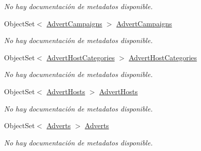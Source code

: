 \begin{DoxyCompactItemize}
\begin{DoxyCompactList}\small\item\em No hay documentación de metadatos disponible. \end{DoxyCompactList}\item 
Object\-Set$<$ \hyperlink{class_microsoft_1_1_samples_1_1_kinect_1_1_basic_interactions_1_1_advert_campaigns}{Advert\-Campaigns} $>$ \hyperlink{class_microsoft_1_1_samples_1_1_kinect_1_1_basic_interactions_1_1_o_m_k_t_d_b_entities_afd5e527893a5c2edff4c472cd26f1731}{Advert\-Campaigns}
\begin{DoxyCompactList}\small\item\em No hay documentación de metadatos disponible. \end{DoxyCompactList}\item 
Object\-Set$<$ \hyperlink{class_microsoft_1_1_samples_1_1_kinect_1_1_basic_interactions_1_1_advert_host_categories}{Advert\-Host\-Categories} $>$ \hyperlink{class_microsoft_1_1_samples_1_1_kinect_1_1_basic_interactions_1_1_o_m_k_t_d_b_entities_a6a2e6e5fad08d2d267036fb38c261060}{Advert\-Host\-Categories}
\begin{DoxyCompactList}\small\item\em No hay documentación de metadatos disponible. \end{DoxyCompactList}\item 
Object\-Set$<$ \hyperlink{class_microsoft_1_1_samples_1_1_kinect_1_1_basic_interactions_1_1_advert_hosts}{Advert\-Hosts} $>$ \hyperlink{class_microsoft_1_1_samples_1_1_kinect_1_1_basic_interactions_1_1_o_m_k_t_d_b_entities_a520efb84ce2ecf6f2feb03010ec87360}{Advert\-Hosts}
\begin{DoxyCompactList}\small\item\em No hay documentación de metadatos disponible. \end{DoxyCompactList}\item 
Object\-Set$<$ \hyperlink{class_microsoft_1_1_samples_1_1_kinect_1_1_basic_interactions_1_1_adverts}{Adverts} $>$ \hyperlink{class_microsoft_1_1_samples_1_1_kinect_1_1_basic_interactions_1_1_o_m_k_t_d_b_entities_abaee4de404271c4676d9e5e9fba8589a}{Adverts}
\begin{DoxyCompactList}\small\item\em No hay documentación de metadatos disponible. \end{DoxyCompactList}\item 

\end{DoxyCompactItemize}
